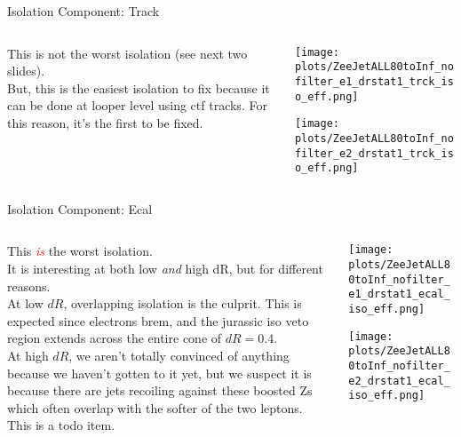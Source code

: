 \documentclass{beamer}
\begin{document}
\begin{frame}{Isolation Component: Track}
  \begin{columns}

    \begin{column}{0.4\textwidth}
      This is not the worst isolation (see next two slides). \\ \bigskip
      But, this is the easiest isolation to fix because it can be done at looper level using ctf tracks. For this reason, it's the first to be fixed.
    \end{column}

    \begin{column}{0.6\textwidth}
      \texttt{[image: plots/ZeeJetALL80toInf\_nofilter\_e1\_drstat1\_trck\_iso\_eff.png]}

      \texttt{[image: plots/ZeeJetALL80toInf\_nofilter\_e2\_drstat1\_trck\_iso\_eff.png]}
    \end{column}
  \end{columns}

\end{frame}


\begin{frame}{Isolation Component: Ecal}
  \begin{columns}

    \begin{column}{0.5\textwidth}
      This \textcolor{red}{\textit{is}} the worst isolation. \\ \bigskip
      It is interesting at both low \textit{and} high dR, but for different reasons. \\ \bigskip
      At low $dR$, overlapping isolation is the culprit. This is expected since electrons brem, and the jurassic iso veto region extends across the entire cone of $dR = 0.4$. \\ \bigskip
      At high $dR$, we aren't totally convinced of anything because we haven't gotten to it yet, but we suspect it is because there are jets recoiling against these boosted Zs which often overlap with the softer of the two leptons. This is a todo item.
    \end{column}

    \begin{column}{0.5\textwidth}
      \texttt{[image: plots/ZeeJetALL80toInf\_nofilter\_e1\_drstat1\_ecal\_iso\_eff.png]}

      \texttt{[image: plots/ZeeJetALL80toInf\_nofilter\_e2\_drstat1\_ecal\_iso\_eff.png]}
    \end{column}
  \end{columns}

\end{frame}
\end{document}
